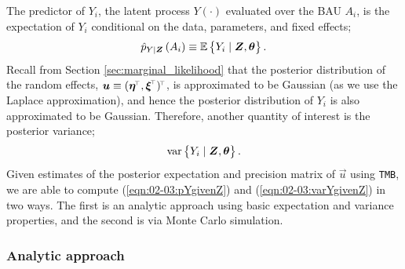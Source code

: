 \documentclass[12pt,a4paper]{article}
\begin{document}
\begin{appendices}
The predictor of $Y_i$, the latent process $Y(\cdot)$ evaluated over the BAU $A_i$, is the expectation of $Y_i$ conditional on the data, parameters, and fixed effects;
\begin{equation}\label{eqn:02-03:pYgivenZ}
    \pYgivenZ{A_i}
    \equiv
    \ECurly{Y_i \mid \vec{Z}, \vec{\theta}}.
\end{equation}
Recall from Section \ref{sec:marginal_likelihood} that the posterior distribution of the random effects, $\vec{u} \equiv (\vec{\eta}^\tp, \vec{\xi}^\tp)^\tp$, is approximated to be Gaussian (as we use the Laplace approximation), and hence the posterior distribution of $Y_i$ is also approximated to be Gaussian.
Therefore, another quantity of interest is the posterior variance;
\begin{equation}\label{eqn:02-03:varYgivenZ}
    \varCurly{Y_i \mid \vec{Z}, \vec{\theta}}.
\end{equation}
Given estimates of the posterior expectation and precision matrix of $\vec{u}$ using \texttt{TMB}, we are able to compute (\ref{eqn:02-03:pYgivenZ}) and (\ref{eqn:02-03:varYgivenZ}) in two ways. 
 The first is an analytic approach using basic expectation and variance properties, and the second is via Monte Carlo simulation.



\subsubsection{Analytic approach}



\end{appendices}
\end{document}
